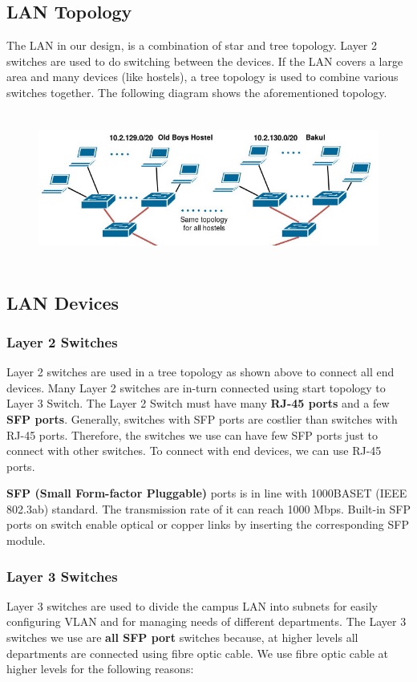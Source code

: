 \documentclass{article}
\begin{document}
\subsection{LAN Topology}
The LAN in our design, is a combination of star and tree topology. Layer 2 switches are used to do switching between the devices. If the LAN covers a large area and many devices (like hostels), a tree topology is used to combine various switches together. The following diagram shows the aforementioned topology.
\begin{figure}[htb]
\includegraphics[width=15cm,height=5cm]{hostel.jpg}
\end{figure}
\subsection{LAN Devices}
\subsubsection{Layer 2 Switches}
Layer 2 switches are used in a tree topology as shown above to connect all end devices. Many Layer 2 switches are in-turn connected using start topology to Layer 3 Switch. The Layer 2 Switch must have many \textbf{RJ-45 ports} and a few \textbf{SFP ports}. Generally, switches with SFP ports are costlier than switches with RJ-45 ports. Therefore, the switches we use can have few SFP ports just to connect with other switches. To connect with end devices, we can use RJ-45 ports.
\par
\textbf{SFP (Small Form-factor Pluggable)} ports is in line with 1000BASET (IEEE 802.3ab) standard. The transmission rate of it can reach 1000 Mbps. Built-in SFP ports on switch enable optical or copper links by inserting the corresponding SFP module.

\subsubsection{Layer 3 Switches}
Layer 3 switches are used to divide the campus LAN into subnets for easily configuring VLAN and for managing needs of different departments. The Layer 3 switches we use are \textbf{all SFP port} switches because, at higher levels all departments are connected using fibre optic cable. We use fibre optic cable at higher levels for the following reasons:
\end{document}
